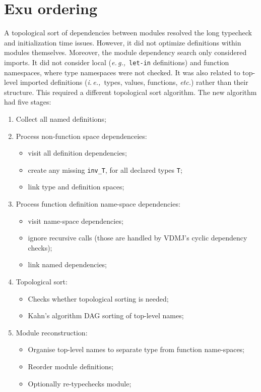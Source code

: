\documentclass[runningheads,a4paper]{llncs}
\newcommand{\eg}{{\em e.\,g.,\/}}
\newcommand{\ie}{{\em i.\,e.,\/}}
\newcommand{\etc}{{\em etc.\/}}
\begin{document}
\section{Exu ordering}\label{sec:exu}

A topological sort of dependencies between modules resolved the long typecheck and initialization time issues. However, it did not optimize definitions within modules themselves. Moreover, the module dependency search only considered imports. It did not consider local (\eg~\texttt{let-in} definitions) and function namespaces, where type namespaces were not checked. It was also related to top-level imported definitions (\ie~types, values, functions, \etc) rather than their structure.    This required a different topological sort algorithm. The new algorithm had five stages: 
%
\begin{enumerate} 
    \item Collect all named definitions;
    \item Process non-function space dependenceies:
        \begin{itemize}
            \item visit all definition dependencies; 
            \item create any missing \verb'inv_T', for all declared types \verb'T';
            \item link type and definition spaces; 
        \end{itemize}
    \item Process function definition name-space dependencies:
        \begin{itemize}
            \item visit name-space dependencies;
            \item ignore recursive calls (those are  handled by VDMJ's cyclic dependency checks);
            \item link named dependencies;  
        \end{itemize}
    \item Topological sort:
        \begin{itemize}
            \item Checks whether topological sorting is needed;
            \item Kahn's algorithm DAG sorting of top-level names; 
         \end{itemize}
    \item Module reconstruction:
         \begin{itemize}
             \item Organise top-level names to separate type from function name-spaces;  
             \item Reorder module definitions;
             \item Optionally re-typechecks module; 
          \end{itemize}
\end{enumerate}  
\end{document}
